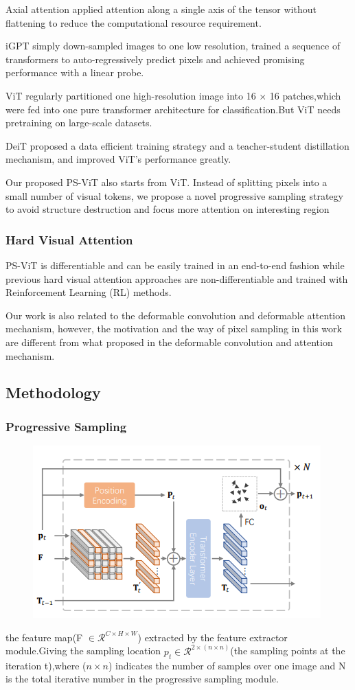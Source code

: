 \documentclass[11pt]{article}
\begin{document}
Axial attention applied attention along a single axis of the tensor without flattening to reduce the computational resource requirement.

iGPT simply down-sampled images to one low resolution, trained a sequence of transformers to auto-regressively predict pixels and achieved promising performance with a linear probe.

ViT regularly partitioned one high-resolution image into 16 × 16 patches,which were fed into one pure transformer architecture for classification.But ViT needs pretraining on large-scale datasets.

DeiT proposed a data efficient training strategy and a teacher-student distillation mechanism, and improved ViT’s performance greatly.

Our proposed PS-ViT also starts from ViT. Instead of splitting pixels into a small number of visual tokens, we propose a novel progressive sampling strategy to avoid structure destruction and focus more attention on interesting region

\subsubsection{Hard Visual Attention}
PS-ViT is differentiable and can be easily trained in an end-to-end fashion while previous hard visual attention approaches are non-differentiable and trained with Reinforcement Learning (RL) methods.

Our work is also related to the deformable convolution and deformable attention mechanism, however, the motivation and the way of pixel sampling in this work are different from what proposed in the deformable convolution and attention mechanism.

\subsection{Methodology}
\subsubsection{Progressive Sampling}
\begin{figure}[h]
	\centering
	\includegraphics[scale = 0.7]{3}
\end{figure}
the feature map(F $\in \mathcal{R}^{C\times H\times W}$) extracted by the feature extractor module.Giving the sampling location $p_t\in \mathcal{R}^{2\times (n\times n)}$(the sampling points at the iteration t),where ($n\times n$) indicates the number of samples over one image and N is the total iterative number in the progressive sampling module.
\end{document}
